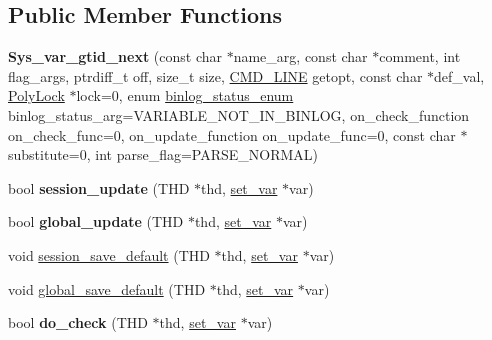 \subsection*{Public Member Functions}
\begin{DoxyCompactItemize}
\item 
\mbox{\label{classSys__var__gtid__next_aa91014d923f07ad06c6ddc73b208be6f}} 
{\bfseries Sys\+\_\+var\+\_\+gtid\+\_\+next} (const char $\ast$name\+\_\+arg, const char $\ast$comment, int flag\+\_\+args, ptrdiff\+\_\+t off, size\+\_\+t size, \mbox{\hyperlink{structCMD__LINE}{C\+M\+D\+\_\+\+L\+I\+NE}} getopt, const char $\ast$def\+\_\+val, \mbox{\hyperlink{classPolyLock}{Poly\+Lock}} $\ast$lock=0, enum \mbox{\hyperlink{classsys__var_a664520ec82191888717c86085bfa83ce}{binlog\+\_\+status\+\_\+enum}} binlog\+\_\+status\+\_\+arg=V\+A\+R\+I\+A\+B\+L\+E\+\_\+\+N\+O\+T\+\_\+\+I\+N\+\_\+\+B\+I\+N\+L\+OG, on\+\_\+check\+\_\+function on\+\_\+check\+\_\+func=0, on\+\_\+update\+\_\+function on\+\_\+update\+\_\+func=0, const char $\ast$substitute=0, int parse\+\_\+flag=P\+A\+R\+S\+E\+\_\+\+N\+O\+R\+M\+AL)
\item 
\mbox{\label{classSys__var__gtid__next_abd932bbf28c033d5c53685a0d34efde5}} 
bool {\bfseries session\+\_\+update} (T\+HD $\ast$thd, \mbox{\hyperlink{classset__var}{set\+\_\+var}} $\ast$var)
\item 
\mbox{\label{classSys__var__gtid__next_a953c09fe900ee633cc6c0c6d25b969e6}} 
bool {\bfseries global\+\_\+update} (T\+HD $\ast$thd, \mbox{\hyperlink{classset__var}{set\+\_\+var}} $\ast$var)
\item 
void \mbox{\hyperlink{classSys__var__gtid__next_a18793c8f29d000b6e34d04475f0cdde5}{session\+\_\+save\+\_\+default}} (T\+HD $\ast$thd, \mbox{\hyperlink{classset__var}{set\+\_\+var}} $\ast$var)
\item 
void \mbox{\hyperlink{classSys__var__gtid__next_a2a742d621214309dd7bcdeacc7321c72}{global\+\_\+save\+\_\+default}} (T\+HD $\ast$thd, \mbox{\hyperlink{classset__var}{set\+\_\+var}} $\ast$var)
\item 
\mbox{\label{classSys__var__gtid__next_ad253ca10ea935c0e5f0a723d3d05cd8d}} 
bool {\bfseries do\+\_\+check} (T\+HD $\ast$thd, \mbox{\hyperlink{classset__var}{set\+\_\+var}} $\ast$var)
\item 

\end{DoxyCompactItemize}
